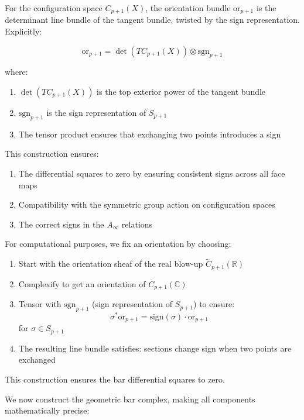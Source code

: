 \begin{definition}
For the configuration space $C_{p+1}(X)$, the orientation bundle $\text{or}_{p+1}$ is the determinant line bundle of the tangent bundle, twisted by the sign representation. Explicitly:

$$\text{or}_{p+1} = \det(TC_{p+1}(X)) \otimes \text{sgn}_{p+1}$$

where:
\begin{enumerate}
\item $\det(TC_{p+1}(X))$ is the top exterior power of the tangent bundle
\item $\text{sgn}_{p+1}$ is the sign representation of $S_{p+1}$
\item The tensor product ensures that exchanging two points introduces a sign
\end{enumerate}

This construction ensures:
\begin{enumerate}
\item The differential squares to zero by ensuring consistent signs across all face maps
\item Compatibility with the symmetric group action on configuration spaces
\item The correct signs in the $A_\infty$ relations
\end{enumerate}
\end{definition}

\begin{remark}
For computational purposes, we fix an orientation by choosing:
\begin{enumerate}
\item Start with the orientation sheaf of the real blow-up $\widetilde{C}_{p+1}(\mathbb{R})$
\item Complexify to get an orientation of $\overline{C}_{p+1}(\mathbb{C})$ 
\item Tensor with $\text{sgn}_{p+1}$ (sign representation of $S_{p+1}$) to ensure:
   $$\sigma^* \text{or}_{p+1} = \text{sign}(\sigma) \cdot \text{or}_{p+1}$$
   for $\sigma \in S_{p+1}$
\item The resulting line bundle satisfies: sections change sign when two points are exchanged
\end{enumerate}
This construction ensures the bar differential squares to zero.
\end{remark}

We now construct the geometric bar complex, making all components mathematically precise:
 
